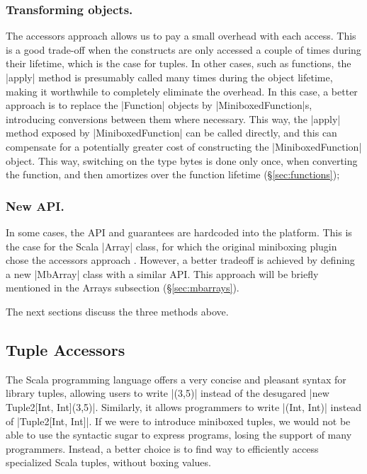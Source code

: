 \subsubsection{Transforming objects.} The accessors approach allows us to pay a small overhead with each access. This is a good trade-off when the constructs are only accessed a couple of times during their lifetime, which is the case for tuples. In other cases, such as functions, the |apply| method is presumably called many times during the object lifetime, making it worthwhile to completely eliminate the overhead. In this case, a better approach is to replace the |Function| objects by |MiniboxedFunction|s, introducing conversions between them where necessary. This way, the |apply| method exposed by |MiniboxedFunction| can be called directly, and this can compensate for a potentially greater cost of constructing the |MiniboxedFunction| object. This way, switching on the type bytes is done only once, when converting the function, and then amortizes over the function lifetime (\S\ref{sec:functions});

\subsubsection{New API.} In some cases, the API and guarantees are hardcoded into the platform. This is the case for the Scala |Array| class, for which the original miniboxing plugin chose the accessors approach \cite{miniboxing}. However, a better tradeoff is achieved by defining a new |MbArray| class with a similar API. This approach will be briefly mentioned in the Arrays subsection (\S\ref{sec:mbarrays}).

The next sections discuss the three methods above.

\subsection{Tuple Accessors}
\label{sec:tuples}

The Scala programming language offers a very concise and pleasant syntax for library tuples, allowing users to write |(3,5)| instead of the desugared |new Tuple2[Int, Int](3,5)|. Similarly, it allows programmers to write |(Int, Int)| instead of |Tuple2[Int, Int]|. If we were to introduce miniboxed tuples, we would not be able to use the syntactic sugar to express programs, losing the support of many programmers. Instead, a better choice is to find way to efficiently access specialized Scala tuples, without boxing values.

